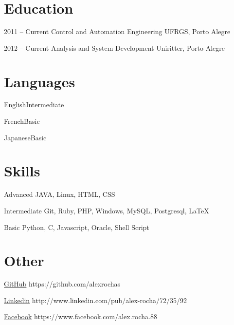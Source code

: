 \documentclass{tccv}
\begin{document}
\section{Education}

\begin{yearlist}

\item{2011 -- Current}
    {Control and Automation Engineering}
    {UFRGS, Porto Alegre}

\item{2012 -- Current}
    {Analysis and System Development}
    {Uniritter, Porto Alegre}

\end{yearlist}

\section{Languages}

\begin{factlist}
\item{English}{Intermediate}
\item{French}{Basic}
\item{Japanese}{Basic}
\end{factlist}

\section{Skills}

\begin{factlist}

\item{Advanced}
    {JAVA, Linux, HTML, CSS}

\item{Intermediate}
    {Git, Ruby, PHP, Windows, MySQL, Postgresql, {\LaTeX}}

\item{Basic}
    {Python, C, Javascript, Oracle, Shell Script}

\end{factlist}

\section{Other}

\begin{factlist}

\item{\href{https://github.com/alexrochas}{GitHub}}
    {https://github.com/alexrochas}

\item{\href{http://www.linkedin.com/pub/alex-rocha/72/35/92}{Linkedin}}
    {http://www.linkedin.com/pub/\linebreak[1]alex-rocha/72/35/92}

\item{\href{https://www.facebook.com/alex.rocha.88}{Facebook}}
{https://www.facebook.com/\linebreak[1]alex.rocha.88}

\end{factlist}
\end{document}
